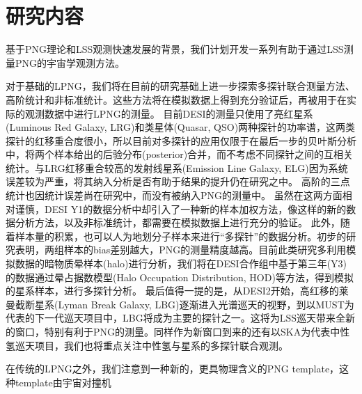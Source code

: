

\chapter{研究内容}
基于PNG理论和LSS观测快速发展的背景，我们计划开发一系列有助于通过LSS测量PNG的宇宙学观测方法。

对于基础的LPNG，我们将在目前的研究基础上进一步探索多探针联合测量方法、高阶统计和非标准统计。这些方法将在模拟数据上得到充分验证后，再被用于在实际的观测数据中进行LPNG的测量。
目前DESI的测量\cite{chaussidon2024desipng}只使用了亮红星系(Luminous Red Galaxy, LRG)和类星体(Quasar, QSO)两种探针的功率谱，这两类探针的红移重合度很小，所以目前对多探针的应用仅限于在最后一步的贝叶斯分析中，将两个样本给出的后验分布(posterior)合并，而不考虑不同探针之间的互相关统计。与LRG红移重合较高的发射线星系(Emission Line Galaxy, ELG)因为系统误差较为严重，将其纳入分析是否有助于结果的提升仍在研究之中。
高阶的三点统计也因统计误差尚在研究中，而没有被纳入PNG的测量中。
虽然在这两方面相对谨慎，DESI Y1的数据分析中却引入了一种新的样本加权方法，像这样的新的数据分析方法，以及非标准统计，都需要在模拟数据上进行充分的验证。
此外，随着样本量的积累，也可以人为地划分子样本来进行“多探针”的数据分析。初步的研究表明，两组样本的bias差别越大，PNG的测量精度越高\cite{barreira2023mtpng}。目前此类研究多利用模拟数据的暗物质晕样本(halo)进行分析，我们将在DESI合作组中基于第三年(Y3)的数据通过晕占据数模型(Halo Occupation Distribution, HOD)等方法，得到模拟的星系样本，进行多探针分析。
最后值得一提的是，从DESI2开始，高红移的莱曼截断星系(Lyman Break Galaxy, LBG)逐渐进入光谱巡天的视野，到以MUST为代表的下一代巡天项目中，LBG将成为主要的探针之一。这将为LSS巡天带来全新的窗口，特别有利于PNG的测量。同样作为新窗口到来的还有以SKA为代表中性氢巡天项目，我们也将重点关注中性氢与星系的多探针联合观测。

在传统的LPNG之外，我们注意到一种新的，更具物理含义的PNG template，这种template由宇宙对撞机